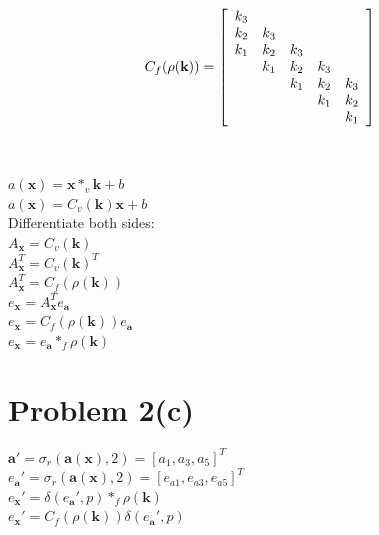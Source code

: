 \documentclass{article}
\begin{document}
\[
C_f(\rho(\textbf{k})) = \left[\begin{array}{*{5}c}
 k_3 &  &  & & \\
 k_2 & k_3 &  & & \\
 k_1 & k_2 & k_3 & & \\
 & k_1 & k_2 & k_3 &\\
  & & k_1 & k_2 & k_3 \\
 &   & & k_1 & k_2 \\
  & &  & & k_1\\
\end{array}\right]
\]\\\\

$a(\textbf{x}) = \textbf{x} \ast_v \textbf{k} + b$\\

$a(\textbf{x}) = C_v(\textbf{k})\textbf{x} + b$\\

Differentiate both sides:\\

$A_\textbf{x} = C_v(\textbf{k})$\\

$A_\textbf{x}^T = C_v(\textbf{k})^T$\\

$A_\textbf{x}^T = C_f(\rho(\textbf{k}))$\\

$e_\textbf{x} = A_\textbf{x}^Te_\textbf{a}$\\

$e_\textbf{x} = C_f(\rho(\textbf{k}))e_\textbf{a}$\\

$e_\textbf{x} = e_\textbf{a} \ast_f \rho(\textbf{k})$

\section*{Problem 2(c)}

$\textbf{a}' = \sigma_r(\textbf{a}(\textbf{x}), 2) = [a_1, a_3, a_5]^T$\\

$e_\textbf{a}' = \sigma_r(\textbf{a}(\textbf{x}), 2) = [e_{a1}, e_{a3}, e_{a5}]^T$\\

$e_\textbf{x}' = \delta(e_\textbf{a}', p) \ast_f \rho(\textbf{k})$\\

$e_\textbf{x}' = C_f(\rho(\textbf{k}))\delta(e_\textbf{a}', p)$\\
\end{document}
